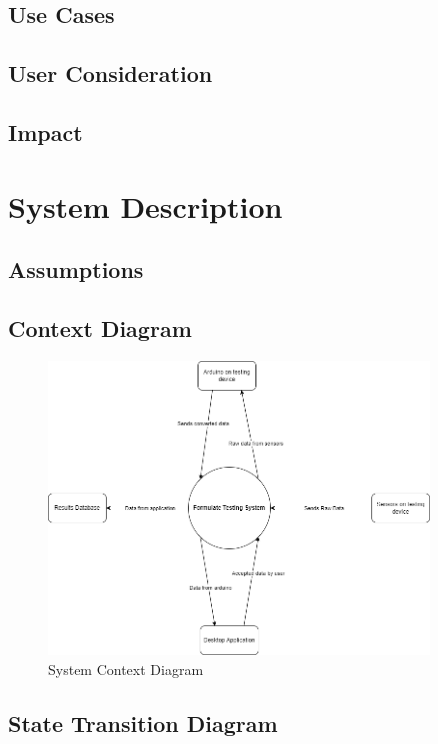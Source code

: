 \documentclass[12pt]{article}
\begin{document}
\subsection{Use Cases} 

\subsection{User Consideration}

\subsection{Impact}


\section{System Description}

\subsection{Assumptions}

\subsection{Context Diagram}
\begin{figure}[h!]
\begin{center}
\includegraphics[width=0.9\textwidth]{sys_context_diagram}
\caption{System Context Diagram}
\label{Fig_SystemContext} 
\end{center}
\end{figure}

\subsection{State Transition Diagram}
\end{document}
